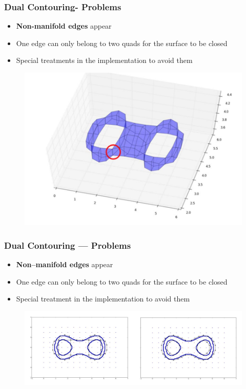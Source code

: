 \begin{frame}

	\frametitle{Dual Contouring- Problems}
	
	\begin{itemize}
	\item  \textbf{Non-manifold edges} appear
	\item One edge can only belong to two quads for the surface to be closed
	\item Special treatments in the implementation to avoid them
	\end{itemize}
	\begin{figure}
	\includegraphics[scale=0.35]{Pictures/DC/manifolds.pdf}
	\end{figure}
	
\end{frame}

\begin{frame}

	\frametitle{Dual Contouring --- Problems}
	
	\begin{itemize}
	\item  \textbf{Non--manifold edges} appear
	\item One edge can only belong to two quads for the surface to be closed
	\item Special treatment in the implementation to avoid them
	\end{itemize}
	\begin{figure}
	\includegraphics[scale=0.35]{Pictures/DC/DC_3.pdf}
	\end{figure}
	
\end{frame}

